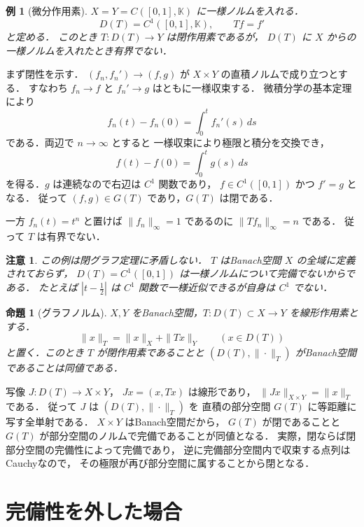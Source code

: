 \documentclass[a5paper,10pt,onecolumn]{jsarticle}
\makeatletter
\theoremstyle{mathnotetheorem}
\newtheorem{proposition}[theorem]{命題}
\newtheorem{example}[theorem]{例}
\newtheorem{remark}[theorem]{注意}
\renewcommand{\proofname}{証明}
\renewenvironment{proof}[1][\proofname]{%
  \par\pushQED{\qed}\normalfont\topsep4\p@\@plus2\p@\relax
  \trivlist\item[\hskip\labelsep\bfseries #1]\ignorespaces
}{\popQED\endtrivlist\@endpefalse}
\makeatother
\begin{document}
\begin{example}[微分作用素]\label{ex:derivative}
$X=Y=C([0,1],\mathbb K)$ に一様ノルムを入れる．
\[
 D(T)=C^1([0,1],\mathbb K),\qquad Tf=f'
\]
と定める．
このとき $T:D(T)\to Y$ は閉作用素であるが，
$D(T)$ に $X$ からの一様ノルムを入れたとき有界でない．
\end{example}
\begin{proof}
まず閉性を示す．
$(f_n,f_n')\to(f,g)$ が
$X\times Y$ の直積ノルムで成り立つとする．
すなわち $f_n\to f$ と $f_n'\to g$ はともに一様収束する．
微積分学の基本定理により
\[
 f_n(t)-f_n(0)=\int_0^t f_n'(s)\,ds
\]
である．両辺で $n\to\infty$ とすると
一様収束により極限と積分を交換でき，
\[
 f(t)-f(0)=\int_0^t g(s)\,ds
\]
を得る．$g$ は連続なので右辺は $C^1$ 関数であり，
$f\in C^1([0,1])$ かつ $f'=g$ となる．
従って $(f,g)\in G(T)$ であり，$G(T)$ は閉である．

一方 $f_n(t)=t^n$ と置けば
$\|f_n\|_\infty=1$ であるのに
$\|Tf_n\|_\infty=n$ である．
従って $T$ は有界でない．
\end{proof}

\begin{remark}
この例は閉グラフ定理に矛盾しない．
$T$ はBanach空間 $X$ の全域に定義されておらず，
$D(T)=C^1([0,1])$ は一様ノルムについて完備でないからである．
たとえば $|t-\tfrac12|$ は
$C^1$ 関数で一様近似できるが自身は $C^1$ でない．
\end{remark}

\begin{proposition}[グラフノルム]\label{prop:graphnorm}
$X,Y$ をBanach空間，$T:D(T)\subset X\to Y$
を線形作用素とする．
\[
 \|x\|_T=\|x\|_X+\|Tx\|_Y\qquad(x\in D(T))
\]
と置く．このとき $T$ が閉作用素であることと
$(D(T),\|\cdot\|_T)$ がBanach空間であることは同値である．
\end{proposition}
\begin{proof}
写像
$J:D(T)\to X\times Y$，
$Jx=(x,Tx)$ は線形であり，
$\|Jx\|_{X\times Y}=\|x\|_T$ である．
従って $J$ は $(D(T),\|\cdot\|_T)$ を
直積の部分空間 $G(T)$ に等距離に写す全単射である．
$X\times Y$ はBanach空間だから，
$G(T)$ が閉であることと
$G(T)$ が部分空間のノルムで完備であることが同値となる．
実際，閉ならば閉部分空間の完備性によって完備であり，
逆に完備部分空間内で収束する点列はCauchyなので，
その極限が再び部分空間に属することから閉となる．
\end{proof}

\section{完備性を外した場合}
\end{document}
